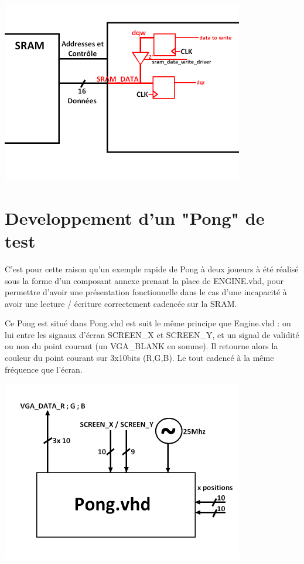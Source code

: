 \documentclass[10pt,a4paper]{report}
\begin{document}
\begin{center}
\includegraphics[width=300pt]{gfx/sram.png}
\end{center}

\section{Developpement d'un "Pong" de test}

C'est pour cette raison qu'un exemple rapide de Pong à deux joueurs à été réalisé sous la forme d'un composant annexe prenant la place de ENGINE.vhd, pour permettre d'avoir une présentation fonctionnelle dans le cas d'une incapacité à avoir une lecture / écriture correctement cadencée sur la SRAM.

Ce Pong est situé dans Pong.vhd est suit le même principe que Engine.vhd : on lui entre les signaux d'écran SCREEN\_X et SCREEN\_Y, et un signal de validité ou non du point courant (un VGA\_BLANK en somme). Il retourne alors la couleur du point courant sur 3x10bits (R,G,B). Le tout cadencé à la même fréquence que l'écran.

\begin{center}
\includegraphics[width=300pt]{gfx/pong.png}
\end{center}
\end{document}

